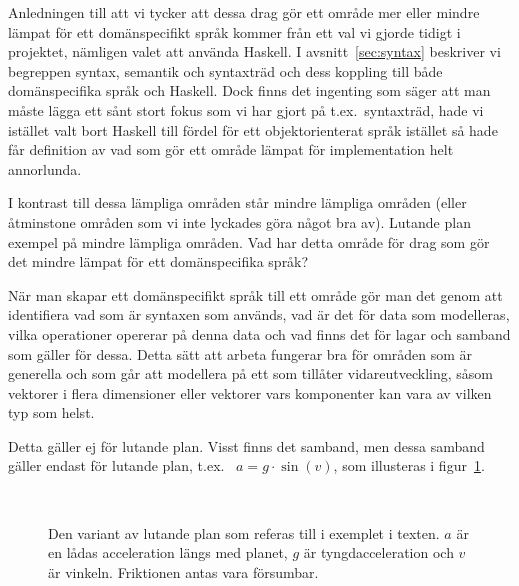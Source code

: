 \begin{draft}
Anledningen till att vi tycker att dessa drag gör ett område mer eller
mindre lämpat för ett domänspecifikt språk kommer från ett val vi gjorde tidigt
i projektet, nämligen valet att använda Haskell. I avsnitt~\ref{sec:syntax}
beskriver vi begreppen syntax, semantik och syntaxträd och dess koppling till
både domänspecifika språk och Haskell. Dock finns det ingenting som säger att
man måste lägga ett sånt stort fokus som vi har gjort på t.ex.~syntaxträd, hade
vi istället valt bort Haskell till fördel för ett objektorienterat språk
istället så hade får definition av vad som gör ett område lämpat för
implementation helt annorlunda.

I kontrast till dessa lämpliga områden står mindre lämpliga områden (eller
åtminstone områden som vi inte lyckades göra något bra av). Lutande plan exempel
på mindre lämpliga områden. Vad har detta område för drag som gör det mindre
lämpat för ett domänspecifika språk?

När man skapar ett domänspecifikt språk till ett område gör man det genom att
identifiera vad som är syntaxen som används, vad är det för data som modelleras,
vilka operationer opererar på denna data och vad finns det för lagar och samband
som gäller för dessa. Detta sätt att arbeta fungerar bra för områden som är
generella och som går att modellera på ett som tillåter vidareutveckling, såsom
vektorer i flera dimensioner eller vektorer vars komponenter kan vara av vilken
typ som helst.

Detta gäller ej för lutande plan. Visst finns det samband, men dessa samband
gäller endast för lutande plan, t.ex.~ $a = g \cdot \sin(v)$, som illusteras i figur~\ref{fig:lutande_plan}.

\begin{figure}[tph]
  \caption{Den variant av lutande plan som referas till i exemplet i texten. $a$
  är en lådas acceleration längs med planet, $g$ är tyngdacceleration och $v$ är
  vinkeln. Friktionen antas vara försumbar.}~\label{fig:lutande_plan}
\end{figure}


\end{draft}
